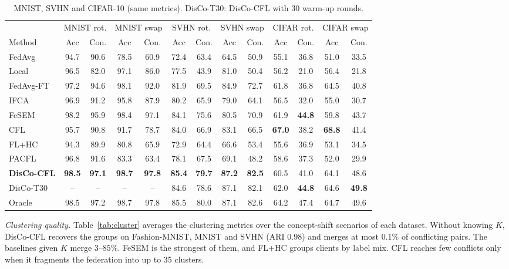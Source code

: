 \documentclass[journal]{IEEEtran}
\theoremstyle{definition}
\begin{document}
\begin{table}[t]
\centering
\caption{MNIST, SVHN and CIFAR-10 (same metrics). DisCo-T30: DisCo-CFL with 30 warm-up rounds.}\label{tab:other}
\footnotesize
\begin{tabular}{lcccccccccccc}
\toprule
 & \multicolumn{2}{c}{MNIST rot.} & \multicolumn{2}{c}{MNIST swap} & \multicolumn{2}{c}{SVHN rot.} & \multicolumn{2}{c}{SVHN swap} & \multicolumn{2}{c}{CIFAR rot.} & \multicolumn{2}{c}{CIFAR swap} \\
\cmidrule(lr){2-3}\cmidrule(lr){4-5}\cmidrule(lr){6-7}\cmidrule(lr){8-9}\cmidrule(lr){10-11}\cmidrule(lr){12-13}
Method & Acc & Con. & Acc & Con. & Acc & Con. & Acc & Con. & Acc & Con. & Acc & Con. \\
\midrule
FedAvg & 94.7 & 90.6 & 78.5 & 60.9 & 72.4 & 63.4 & 64.5 & 50.9 & 55.1 & 36.8 & 51.0 & 33.5 \\
Local & 96.5 & 82.0 & 97.1 & 86.0 & 77.5 & 43.9 & 81.0 & 50.4 & 56.2 & 21.0 & 56.4 & 21.8 \\
FedAvg-FT & 97.2 & 94.6 & 98.1 & 92.0 & 81.9 & 69.5 & 84.9 & 72.7 & 61.8 & 36.8 & 64.5 & 40.8 \\
IFCA & 96.9 & 91.2 & 95.8 & 87.9 & 80.2 & 65.9 & 79.0 & 64.1 & 56.5 & 32.0 & 55.0 & 30.7 \\
FeSEM & 98.2 & 95.9 & 98.4 & 97.1 & 84.1 & 75.6 & 80.5 & 70.9 & 61.9 & \textbf{44.8} & 59.8 & 43.7 \\
CFL & 95.7 & 90.8 & 91.7 & 78.7 & 84.0 & 66.9 & 83.1 & 66.5 & \textbf{67.0} & 38.2 & \textbf{68.8} & 41.4 \\
FL+HC & 94.3 & 89.9 & 80.8 & 65.9 & 72.9 & 64.4 & 66.6 & 53.4 & 55.6 & 36.9 & 53.1 & 34.5 \\
PACFL & 96.8 & 91.6 & 83.3 & 63.4 & 78.1 & 67.5 & 69.1 & 48.2 & 58.6 & 37.3 & 52.0 & 29.9 \\
\textbf{DisCo-CFL} & \textbf{98.5} & \textbf{97.1} & \textbf{98.7} & \textbf{97.8} & \textbf{85.4} & \textbf{79.7} & \textbf{87.2} & \textbf{82.5} & 60.5 & 41.0 & 64.1 & 48.6 \\
DisCo-T30 & -- & -- & -- & -- & 84.6 & 78.6 & 87.1 & 82.1 & 62.0 & \textbf{44.8} & 64.6 & \textbf{49.8} \\
\midrule
Oracle & 98.5 & 97.2 & 98.7 & 97.8 & 85.5 & 80.0 & 87.1 & 82.6 & 64.2 & 47.4 & 64.7 & 49.6 \\
\bottomrule
\end{tabular}
\end{table}

\emph{Clustering quality.} Table~\ref{tab:cluster} averages the clustering metrics over the concept-shift scenarios of each dataset. Without knowing $K$, DisCo-CFL recovers the groups on Fashion-MNIST, MNIST and SVHN (ARI $0.98$) and merges at most $0.1\%$ of conflicting pairs. The baselines given $K$ merge $3$--$85\%$. FeSEM is the strongest of them, and FL+HC groups clients by label mix. CFL reaches few conflicts only when it fragments the federation into up to 35 clusters.
\end{document}
